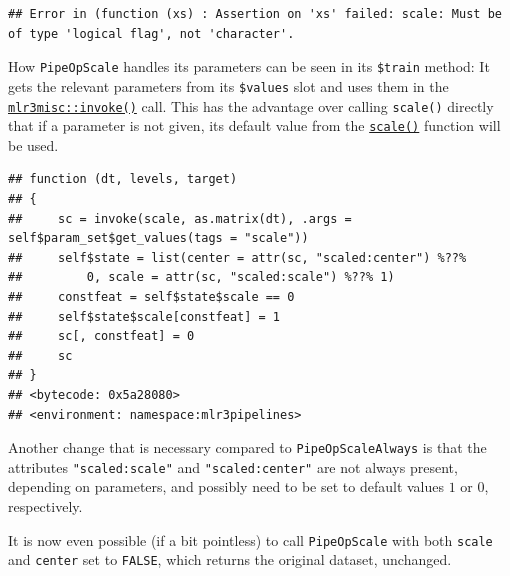 \documentclass[]{scrbook}
\newenvironment{Shaded}{\begin{snugshade}}{\end{snugshade}}
\newcommand{\DecValTok}[1]{\textcolor[rgb]{0.00,0.00,0.81}{#1}}
\newcommand{\KeywordTok}[1]{\textcolor[rgb]{0.13,0.29,0.53}{\textbf{#1}}}
\newcommand{\NormalTok}[1]{#1}
\newcommand{\OperatorTok}[1]{\textcolor[rgb]{0.81,0.36,0.00}{\textbf{#1}}}
\newcommand{\OtherTok}[1]{\textcolor[rgb]{0.56,0.35,0.01}{#1}}
\newcommand{\StringTok}[1]{\textcolor[rgb]{0.31,0.60,0.02}{#1}}
\renewenvironment{Shaded} {\begin{snugshade}\small} {\end{snugshade}}
\begin{document}
\begin{verbatim}
## Error in (function (xs) : Assertion on 'xs' failed: scale: Must be of type 'logical flag', not 'character'.
\end{verbatim}

How \texttt{PipeOpScale} handles its parameters can be seen in its \texttt{\$train} method: It gets the relevant parameters from its \texttt{\$values} slot and uses them in the \href{https://mlr3misc.mlr-org.com/reference/invoke.html}{\texttt{mlr3misc::invoke()}} call.
This has the advantage over calling \texttt{scale()} directly that if a parameter is not given, its default value from the \href{https://www.rdocumentation.org/packages/base/topics/scale}{\texttt{scale()}} function will be used.

\begin{Shaded}
\end{Shaded}

\begin{verbatim}
## function (dt, levels, target) 
## {
##     sc = invoke(scale, as.matrix(dt), .args = self$param_set$get_values(tags = "scale"))
##     self$state = list(center = attr(sc, "scaled:center") %??% 
##         0, scale = attr(sc, "scaled:scale") %??% 1)
##     constfeat = self$state$scale == 0
##     self$state$scale[constfeat] = 1
##     sc[, constfeat] = 0
##     sc
## }
## <bytecode: 0x5a28080>
## <environment: namespace:mlr3pipelines>
\end{verbatim}

Another change that is necessary compared to \texttt{PipeOpScaleAlways} is that the attributes \texttt{"scaled:scale"} and \texttt{"scaled:center"} are not always present, depending on parameters, and possibly need to be set to default values \(1\) or \(0\), respectively.

It is now even possible (if a bit pointless) to call \texttt{PipeOpScale} with both \texttt{scale} and \texttt{center} set to \texttt{FALSE}, which returns the original dataset, unchanged.

\begin{Shaded}
\end{Shaded}
\end{document}
